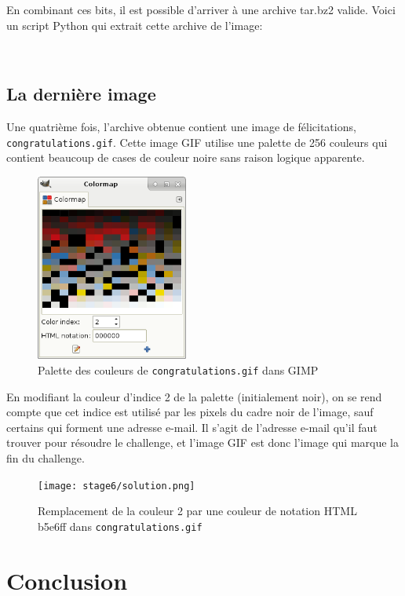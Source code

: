 \documentclass[a4paper,10pt]{article}
\newcommand{\pyinput}[1]{%
    \noindent{\color[rgb]{0.5, 0.5, 0.5}{\rule{\textwidth}{0.4pt}}}
     \\
    \noindent{\color[rgb]{0.5, 0.5, 0.5}{\rule{\textwidth}{0.4pt}}}
}
\begin{document}
En combinant ces bits, il est possible d'arriver à une archive tar.bz2 valide.
Voici un script Python qui extrait cette archive de l'image:

\pyinput{stage6/extract3_from_tiff.py.inc.tex}

\subsection{La dernière image}

Une quatrième fois, l'archive obtenue contient une image de félicitations, \texttt{congratulations.gif}.
Cette image GIF utilise une palette de 256 couleurs qui contient beaucoup de cases de couleur noire sans raison logique apparente.

\begin{figure}[ht]
  \centering
  \includegraphics[width=5cm]{stage6/shot-gifcolormap.png}
  \caption{Palette des couleurs de \texttt{congratulations.gif} dans GIMP}
  \label{fig6-gifcolormap}
\end{figure}

En modifiant la couleur d'indice 2 de la palette (initialement noir), on se rend compte que cet indice est utilisé par les pixels du cadre noir de l'image, sauf certains qui forment une adresse e-mail.
Il s'agit de l'adresse e-mail qu'il faut trouver pour résoudre le challenge, et l'image GIF est donc l'image qui marque la fin du challenge.

\begin{figure}[ht]
  \centering
  \texttt{[image: stage6/solution.png]}
  \caption{Remplacement de la couleur 2 par une couleur de notation HTML b5e6ff dans \texttt{congratulations.gif}}
  \label{fig6-solution}
\end{figure}

\clearpage
\section{Conclusion}
\end{document}
